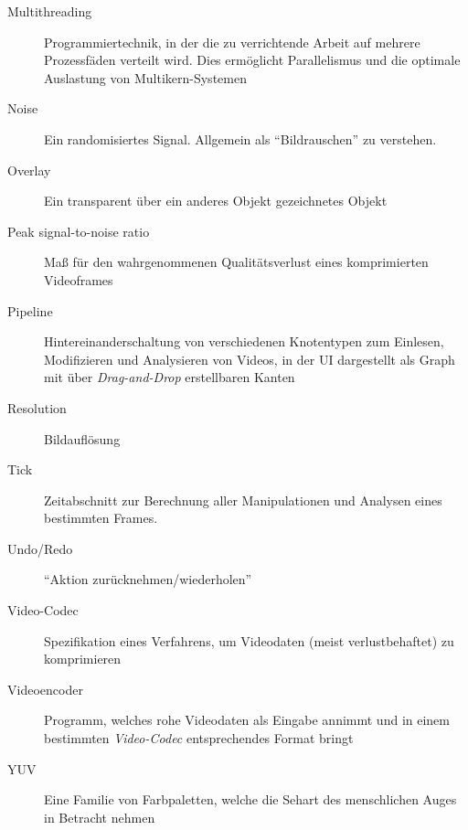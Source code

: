 \begin{description}
    \item[Multithreading] Programmiertechnik, in der die zu verrichtende Arbeit auf mehrere Prozessfäden verteilt wird. Dies ermöglicht Parallelismus und die optimale Auslastung von Multikern-Systemen
    \item[Noise] Ein randomisiertes Signal. Allgemein als ``Bildrauschen'' zu verstehen.
    \item[Overlay] Ein transparent über ein anderes Objekt gezeichnetes Objekt
    \item[Peak signal-to-noise ratio] Maß für den wahrgenommenen Qualitätsverlust eines komprimierten Videoframes
    \item[Pipeline] Hintereinanderschaltung von verschiedenen Knotentypen zum Einlesen, Modifizieren und Analysieren von Videos, in der UI dargestellt als Graph mit über \emph{Drag-and-Drop} erstellbaren Kanten
    \item[Resolution] Bildauflösung
    \item[Tick] Zeitabschnitt zur Berechnung aller Manipulationen und Analysen eines bestimmten Frames.
    \item[Undo/Redo] ``Aktion zurücknehmen/wiederholen''
    \item[Video-Codec] Spezifikation eines Verfahrens, um Videodaten (meist verlustbehaftet) zu komprimieren
    \item[Videoencoder] Programm, welches rohe Videodaten als Eingabe annimmt und in einem bestimmten \emph{Video-Codec} entsprechendes Format bringt
    \item[YUV] Eine Familie von Farbpaletten, welche die Sehart des menschlichen Auges in Betracht nehmen
\end{description}
